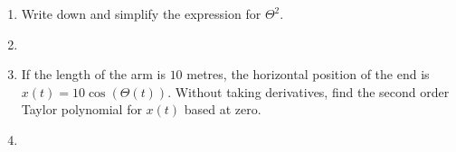 \begin{enumerate}
\begin{enumerate}
        \item Write down and simplify the expression for $\Theta^2$. 
        
        \item 

        
        \item If the length of the arm is $10$ metres, the horizontal position of the end is $x(t) = 10 \cos(\Theta(t))$. Without taking derivatives, find the second order Taylor polynomial for $x(t)$ based at zero. 
        
        \item  

        
    \end{enumerate}
		
\end{enumerate}
